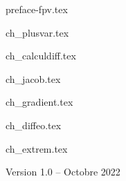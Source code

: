 \documentclass[11pt,twoside,openright]{report}
\begin{document}
\renewcommand{\contentsname}{Sommaire}




{preface-fpv.tex}

\debutchapitres

{ch_plusvar.tex}
 
{ch_calculdiff.tex}

{ch_jacob.tex}

{ch_gradient.tex}

{ch_diffeo.tex}

{ch_extrem.tex}
%
%
%
\vfill

\centerline{Version 1.0 -- Octobre 2022}
\end{document}
